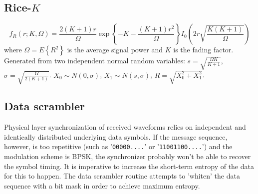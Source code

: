 \subsection{Rice-$K$}
\[
    f_R(r;K,\Omega) = 
        \frac{2(K+1)r}{\Omega}
        \exp\left\{-K-\frac{(K+1)r^2}{\Omega}\right\}
        I_0\left( 2r\sqrt{\frac{K(K+1)}{\Omega}} \right)
\]
where $\Omega=E\left\{R^2\right\}$ is the average signal power and $K$ is the
fading factor.
Generated from two independent normal random variables:
$s = \sqrt{\frac{\Omega K}{K+1}}$,
$\sigma = \sqrt{\frac{\Omega}{2(K+1)}}$.
$X_0 \sim N(0,\sigma)$,
$X_1 \sim N(s,\sigma)$,
$R = \sqrt{X_0^2 + X_1^2}$.


\subsection{Data scrambler}
Physical layer synchronization of received waveforms relies on independent and
identically distributed underlying data symbols.
If the message sequence, however, is too repetitive
(such as '{\tt 00000....}' or '{\tt 11001100....}')
and the modulation scheme is BPSK, the synchronizer probably won't be able to
recover the symbol timing.
It is imperative to increase the short-term entropy of the data for this to happen.
The data scrambler routine attempts to 'whiten' the data sequence with a bit
mask in order to achieve maximum entropy.

